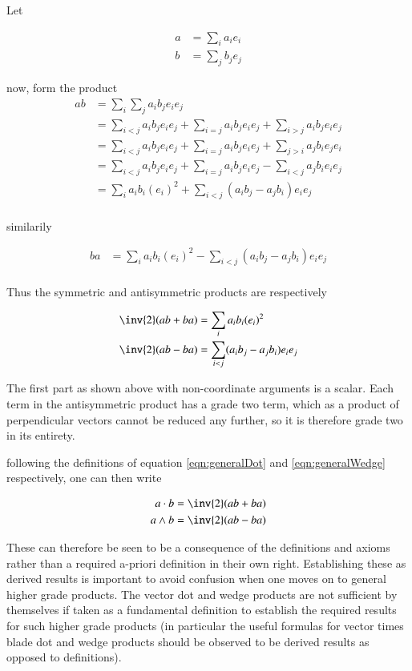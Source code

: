 \documentclass{article}
\begin{document}
Let

\begin{align*}
a &= \sum_i a_i e_i \\
b &= \sum_j b_j e_j
\end{align*}

now, form the product
\begin{align*}
a b
&= \sum_i \sum_j a_i b_j e_i e_j \\
&= 
 \sum_{i < j} a_i b_j e_i e_j 
+\sum_{i = j} a_i b_j e_i e_j 
+\sum_{i > j} a_i b_j e_i e_j \\
&= 
 \sum_{i < j} a_i b_j e_i e_j 
+\sum_{i = j} a_i b_j e_i e_j 
+\sum_{j > i} a_j b_i e_j e_i \\
&= 
 \sum_{i < j} a_i b_j e_i e_j 
+\sum_{i = j} a_i b_j e_i e_j 
-\sum_{i < j} a_j b_i e_i e_j \\
&= \sum_{i} a_i b_i (e_i)^2 
+ \sum_{i < j} (a_i b_j - a_j b_i) e_i e_j  \\
\end{align*}

similarily

\begin{align*}
b a &= \sum_{i} a_i b_i (e_i)^2 - \sum_{i < j} (a_i b_j - a_j b_i) e_i e_j  \\
\end{align*}

Thus the symmetric and antisymmetric products are respectively

\begin{align*}
\inv{2}(a b + b a) &= \sum_{i} a_i b_i (e_i)^2 \\
\inv{2}(a b - b a) &= \sum_{i < j} (a_i b_j - a_j b_i) e_i e_j  \\
\end{align*}

The first part as shown above with non-coordinate arguments is a scalar.  Each term in the antisymmetric product has a grade two term, which
as a product of perpendicular vectors cannot be reduced any further, so it is therefore grade two in its entirety.

following the definitions of equation \ref{eqn:generalDot} and \ref{eqn:generalWedge} respectively, one can then write

\begin{align}
a \cdot b &= \inv{2}(a b + b a) \\
a \wedge b &= \inv{2}(a b - b a)
\end{align}

These can therefore be seen to be a consequence of the definitions and axioms rather than a required a-priori definition in their own right.  Establishing
these as derived results is important to avoid confusion when one moves on to general higher grade products.  The vector dot and wedge products are
not sufficient by themselves if taken as a fundamental definition to establish the required results for such higher grade products (in particular the useful
formulas for vector times blade dot and wedge products should be observed to be derived results as opposed to definitions).
\end{document}

